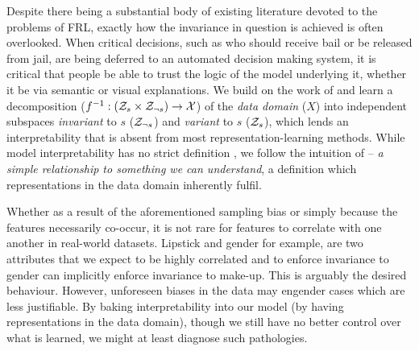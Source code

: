 Despite there being a substantial body of existing literature devoted to the problems of \ac{FRL},
exactly how the invariance in question is achieved is often overlooked.
%
When critical decisions, such as who should receive bail or be released from jail, are being
deferred to an automated decision making system, it is critical that people be able to trust the
logic of the model underlying it, whether it be via semantic or visual explanations. 
%
We build on the work of \citet{QuaShaTho19} and learn a decomposition ($f^{-1}: ({\mathcal{Z}}_s \times
{\mathcal{Z}}_{\neg s}) \to {\mathcal{X}}$) of the \emph{data domain} ($X$) into independent subspaces \emph{invariant}
to  $s$ (${\mathcal{Z}}_{\neg s}$) and \emph{variant} to $s$ (${\mathcal{Z}}_{s}$), which lends an interpretability
that is absent from most representation-learning methods. 
%
While model interpretability has no strict definition \citep{zhang2018visual}, we follow the
intuition of \citet{adel2018discovering} -- \emph{a simple relationship to something we can
understand}, a definition which representations in the data domain inherently fulfil.

Whether as a result of the aforementioned sampling bias or simply because the features necessarily
co-occur, it is not rare for features to correlate with one another in real-world datasets.
%
Lipstick and gender for example, are two attributes that we expect to be highly correlated and to
enforce invariance to gender can implicitly enforce invariance to make-up. 
%
This is arguably the desired behaviour. 
%
However, unforeseen biases in the data may engender cases which are less justifiable. 
%
By baking interpretability into our model (by having representations in the data domain), though we
still have no better control over what is learned, we might at least diagnose such pathologies.

